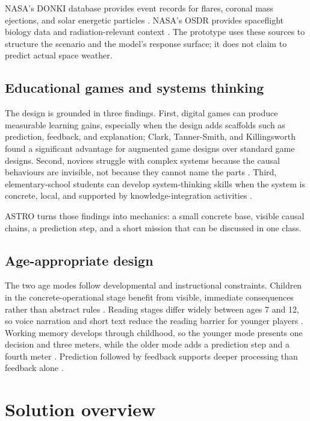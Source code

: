 \documentclass[11pt,a4paper]{article}
\begin{document}
NASA's DONKI database provides event records for flares, coronal mass ejections, and solar energetic particles \cite{donki}. NASA's OSDR provides spaceflight biology data and radiation-relevant context \cite{osdr}. The prototype uses these sources to structure the scenario and the model's response surface; it does not claim to predict actual space weather.

\subsection{Educational games and systems thinking}

The design is grounded in three findings. First, digital games can produce measurable learning gains, especially when the design adds scaffolds such as prediction, feedback, and explanation; Clark, Tanner-Smith, and Killingsworth \cite{clark2016} found a significant advantage for augmented game designs over standard game designs. Second, novices struggle with complex systems because the causal behaviours are invisible, not because they cannot name the parts \cite{hmelo2007}. Third, elementary-school students can develop system-thinking skills when the system is concrete, local, and supported by knowledge-integration activities \cite{benzvi2010}.

ASTRO turns those findings into mechanics: a small concrete base, visible causal chains, a prediction step, and a short mission that can be discussed in one class.

\subsection{Age-appropriate design}

The two age modes follow developmental and instructional constraints. Children in the concrete-operational stage benefit from visible, immediate consequences rather than abstract rules \cite{piaget1952}. Reading stages differ widely between ages 7 and 12, so voice narration and short text reduce the reading barrier for younger players \cite{chall1983}. Working memory develops through childhood, so the younger mode presents one decision and three meters, while the older mode adds a prediction step and a fourth meter \cite{gathercole2004}. Prediction followed by feedback supports deeper processing than feedback alone \cite{wouters2008}.

\section{Solution overview}
\end{document}

